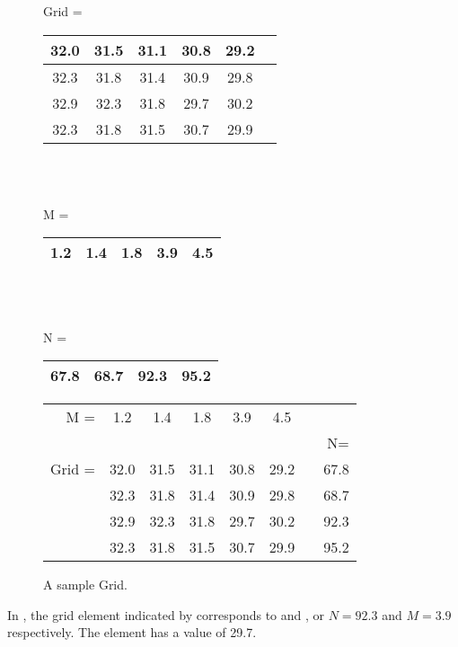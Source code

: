 \begin{description}
\begin{figure}[ht]
\W\label{toolkit,grid} 
\begin{center} 
\begin{ifhtml}
Grid =
\begin{tabular}{|c|c|c|c|c|c|} \hline 
32.0 & 31.5 & 31.1 & 30.8 & 29.2 \\ \hline
32.3 & 31.8 & 31.4 & 30.9 & 29.8 \\ \hline
32.9 & 32.3 & 31.8 & 29.7 & 30.2 \\ \hline
32.3 & 31.8 & 31.5 & 30.7 & 29.9 \\ \hline
\end{tabular} 
\\ \strut \\ M =
\begin{tabular}{|c|c|c|c|c|} \hline
1.2 & 1.4 & 1.8 & 3.9 & 4.5 \\ \hline
\end{tabular}
\\ \strut \\ N =
\begin{tabular}{|c|c|c|c|} \hline
67.8 & 68.7 & 92.3 & 95.2 \\ \hline
\end{tabular}
\end{ifhtml}
\begin{iftex}
\begin{tabular}{r|c|c|c|c|c|c|c|} \cline{2-6} 
M =    & 1.2 & 1.4 & 1.8 & 3.9 & 4.5 & \multicolumn{2}{c}{}\\ \cline{2-6}
\multicolumn{8}{r}{N=}\\ \cline{2-6}\cline{8-8}
Grid = & 32.0 & 31.5 & 31.1 & 30.8 & 29.2 & & 67.8 \\ \cline{2-6}\cline{8-8}
       & 32.3 & 31.8 & 31.4 & 30.9 & 29.8 & & 68.7 \\ \cline{2-6}\cline{8-8}
       & 32.9 & 32.3 & 31.8 & 29.7 & 30.2 & & 92.3 \\ \cline{2-6}\cline{8-8}
       & 32.3 & 31.8 & 31.5 & 30.7 & 29.9 & & 95.2 \\ \cline{2-6}\cline{8-8}
\end{tabular} 
\end{iftex}
\end{center} 
\caption{A sample Grid.}
\T\label{toolkit,grid} 
\end{figure}

In , the grid element indicated by
 corresponds to  and , or $N =
92.3$ and $M = 3.9$ respectively.  The element has a value of 29.7.

\end{description}









